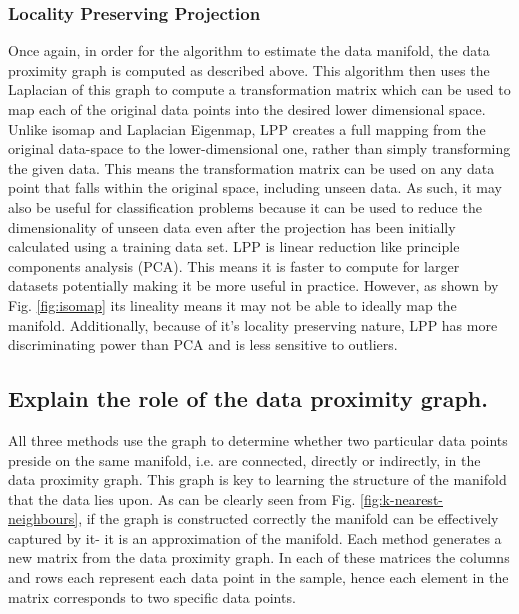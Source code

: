 \documentclass{article}
\begin{document}
\subsubsection{Locality Preserving Projection}%
Once again, in order for the algorithm to estimate the data manifold, the data proximity graph is computed as described above. This algorithm then uses the Laplacian of this graph to compute a transformation matrix which can be used to map each of the original data points into the desired lower dimensional space. Unlike isomap and Laplacian Eigenmap, LPP creates a full mapping from the original data-space to the lower-dimensional one, rather than simply transforming the given data. This means the transformation matrix can be used on any data point that falls within the original space, including unseen data. As such, it may also be useful for classification problems because it can be used to reduce the dimensionality of unseen data even after the projection has been initially calculated using a training data set. LPP is linear reduction like principle components analysis (PCA). This means it is faster to compute for larger datasets potentially making it be more useful in practice\cite{lpp}. However, as shown by Fig. \ref{fig:isomap} its lineality means it may not be able to ideally map the manifold. Additionally, because of it's locality preserving nature, LPP has more discriminating power than PCA and is less sensitive to outliers.

\subsection{Explain the role of the data proximity graph.}
All three methods use the graph to determine whether two particular data points preside on the same manifold, i.e. are connected, directly or indirectly, in the data proximity graph. This graph is key to learning the structure of the manifold that the data lies upon. As can be clearly seen from Fig. \ref{fig:k-nearest-neighbours}, if the graph is constructed correctly the manifold can be effectively captured by it- it is an approximation of the manifold. Each method generates a new matrix from the data proximity graph. In each of these matrices the columns and rows each represent each data point in the sample, hence each element in the matrix corresponds to two specific data points.\\
\end{document}
